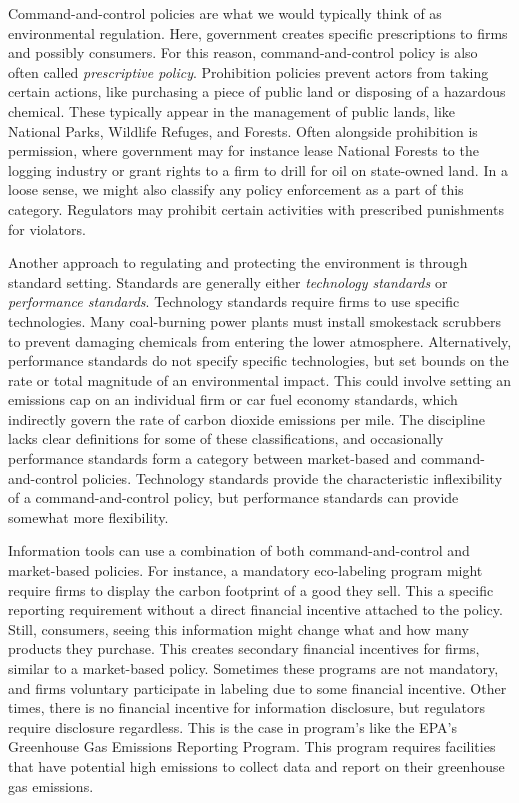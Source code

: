 Command-and-control policies are what we would typically think of as environmental regulation. Here, government creates specific prescriptions to firms and possibly consumers. For this reason, command-and-control policy is also often called \emph{prescriptive policy}. Prohibition policies prevent actors from taking certain actions, like purchasing a piece of public land or disposing of a hazardous chemical. These typically appear in the management of public lands, like National Parks, Wildlife Refuges, and Forests. Often alongside prohibition is permission, where government may for instance lease National Forests to the logging industry or grant rights to a firm to drill for oil on state-owned land. In a loose sense, we might also classify any policy enforcement as a part of this category. Regulators may prohibit certain activities with prescribed punishments for violators. 

Another approach to regulating and protecting the environment is through standard setting. Standards are generally either \emph{technology standards} or \emph{performance standards}. Technology standards require firms to use specific technologies. Many coal-burning power plants must install smokestack scrubbers to prevent damaging chemicals from entering the lower atmosphere. Alternatively, performance standards do not specify specific technologies, but set bounds on the rate or total magnitude of an environmental impact. This could involve setting an emissions cap on an individual firm or car fuel economy standards, which indirectly govern the rate of carbon dioxide emissions per mile. The discipline lacks clear definitions for some of these classifications, and occasionally performance standards form a category between market-based and command-and-control policies. Technology standards provide the characteristic inflexibility of a command-and-control policy, but performance standards can provide somewhat more flexibility. 

Information tools can use a combination of both command-and-control and market-based policies. For instance, a mandatory eco-labeling program might require firms to display the carbon footprint of a good they sell. This a specific reporting requirement without a direct financial incentive attached to the policy. Still, consumers, seeing this information might change what and how many products they purchase. This creates secondary financial incentives for firms, similar to a market-based policy. Sometimes these programs are not mandatory, and firms  voluntary participate in labeling due to some financial incentive. Other times, there is no financial incentive for information disclosure, but regulators require disclosure regardless. This is the case in program's like the EPA's Greenhouse Gas Emissions Reporting Program. This program requires facilities that have potential high emissions to collect data and report on their greenhouse gas emissions.


